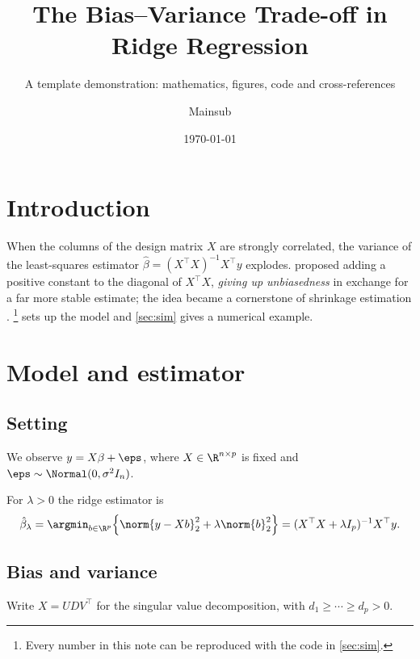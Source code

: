 \documentclass[lang=en]{mainsub-report}
\title{The Bias--Variance Trade-off in Ridge Regression}
\subtitle{A template demonstration: mathematics, figures, code and cross-references}
\author{Mainsub}
\affiliation{University of Science and Technology of China}
\date{\today}
\begin{document}
\maketitle

\section{Introduction}

When the columns of the design matrix $X$ are strongly correlated, the variance of the
least-squares estimator $\hat\beta = (X^\top X)^{-1}X^\top y$ explodes.
\textcite{hoerl1970ridge} proposed adding a positive constant to the diagonal of $X^\top X$,
\emph{giving up unbiasedness} in exchange for a far more stable estimate; the idea became a
cornerstone of shrinkage estimation \parencite{hastie2009elements}.%
\footnote{Every number in this note can be reproduced with the code in \cref{sec:sim}.}
 sets up the model and \cref{sec:sim} gives a numerical example.

\section{Model and estimator}\label{sec:model}

\subsection{Setting}

\begin{assumption}\label{asm:gauss}
We observe $y = X\beta + \eps$, where $X\in\R^{n\times p}$ is fixed and $\eps \sim \Normal(0, \sigma^2 I_n)$.
\end{assumption}

\begin{definition}\label{def:ridge}
For $\lambda > 0$ the ridge estimator is
\begin{equation}\label{eq:ridge}
  \hat\beta_\lambda
  = \argmin_{b\in\R^p} \Bigl\{ \norm{y - Xb}_2^2 + \lambda \norm{b}_2^2 \Bigr\}
  = (X^\top X + \lambda I_p)^{-1} X^\top y .
\end{equation}
\end{definition}

\subsection{Bias and variance}

Write $X = UDV^\top$ for the singular value decomposition, with $d_1\ge\cdots\ge d_p>0$.
\end{document}
